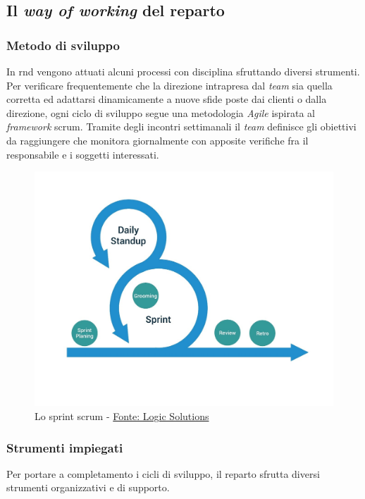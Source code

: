 \subsection{Il \textit{way of working} del reparto}
\subsubsection{Metodo di sviluppo}
In \acrshort{rnd} vengono attuati alcuni processi con disciplina sfruttando diversi strumenti.
Per verificare frequentemente che la direzione intrapresa dal \textit{team} sia quella corretta ed adattarsi dinamicamente a nuove sfide poste dai clienti o dalla direzione, ogni ciclo di sviluppo segue una metodologia \textit{Agile} ispirata al \textit{framework} \gls{scrum}\glsfirstoccur. Tramite degli incontri settimanali il \textit{team} definisce gli obiettivi da raggiungere che monitora giornalmente con apposite verifiche fra il responsabile e i soggetti interessati.

\begin{figure}[H] 
    \centering 
    \includegraphics[width=0.9\columnwidth]{immagini/scrum-blog.jpg} 
    \caption{Lo sprint \gls{scrum} - \href{https://www.logicsolutions.com/what-is-scrum-how-it-works/}{Fonte: Logic Solutions}}
    \label{fig:sprintScrum}
\end{figure}

\subsubsection{Strumenti impiegati}
\label{ssec:usedTools}
Per portare a completamento i cicli di sviluppo, il reparto sfrutta diversi strumenti organizzativi e di supporto.
